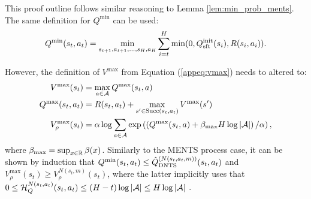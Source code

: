             \begin{proofoutline}
                This proof outline follows similar reasoning to Lemma \ref{lem:min_prob_ments}. The same definition for $Q^{\min}$ can be used:
                \begin{align}
                    Q^{\min}(s_t,a_t) = \min_{s_{t+1},a_{t+1},...,s_H,a_H} \sum_{i=t}^H \min(0, Q^{\text{init}}_{{\textnormal{sft}}}(s_i), R(s_i,a_i)).
                \end{align}

                However, the definition of $V^{\max}$ from Equation (\ref{appeq:vmax}) needs to altered to:
                \begin{align}
                    V^{\max}(s_t) &= \max_{a\in\mathcal{A}} Q^{\max}(s_t,a) \\
                    Q^{\max}(s_t,a_t) &= R(s_t,a_t) + \max_{s'\in{\textnormal{Succ}(s_t,a_t)}} V^{\max}(s') \\
                    V_\rho^{\max}(s_t) &= \alpha \log \sum_{a\in\mathcal{A}} \exp \left(\left(Q^{\max}(s_t,a) + \beta_{\max}H\log|\mathcal{A}| \right)/\alpha\right), 
                \end{align}
                where $\beta_{\max}=\sup_{x\in\mathbb{R}}\beta(x)$. Similarly to the MENTS process case, it can be shown by induction that $Q^{\min}(s_t,a_t)\leq {\hat{Q}^{(N(s_t,a_t,m))}_{{\textnormal{DNTS}}}}(s_t,a_t)$ and $V_\rho^{\max}(s_t)\geq V_{\rho}^{N(s_t,m)}(s_t)$, where the latter implicitly uses that $0 \leq \mathcal{H}_Q^{N(s_t,a_t)}(s_t,a_t) \leq (H-t)\log|\mathcal{A}| \leq H\log|\mathcal{A}|$ . 
                

\end{proofoutline}
